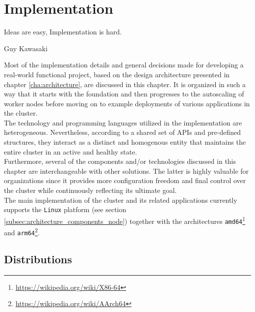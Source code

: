 \chapter{Implementation}
\label{cha:implementation}

\epigraph{Ideas are easy, Implementation is hard.}{Guy Kawasaki}

Most of the implementation details and general decisions made for developing a
real-world functional project, based on the design architecture presented in chapter
\ref{cha:architecture}, are discussed in this chapter. It is organized in such a
way that it starts with the foundation and then progresses to the autoscaling of
worker nodes before moving on to example deployments of various applications in the
cluster. \\ %
The technology and programming languages utilized in the implementation are heterogeneous.
Nevertheless, according to a shared set of APIs and pre-defined structures, they
interact as a distinct and homogenous entity that maintains the entire cluster
in an active and healthy state. \\ %
Furthermore, several of the components and/or technologies discussed in this chapter
are interchangeable with other solutions. The latter is highly valuable for
organizations since it provides more configuration freedom and final control
over the cluster while continuously reflecting its ultimate goal. \\ %
The main implementation of the cluster and its related applications currently
supports the \texttt{Linux} platform (see section
\ref{subsec:architecture_components_node}) together with the architectures \texttt{amd64}\footnote{\url{https://wikipedia.org/wiki/X86-64}}
and \texttt{arm64}\footnote{\url{https://wikipedia.org/wiki/AArch64}}.

\section{Distributions}
\label{sec:implementation_distributions}


